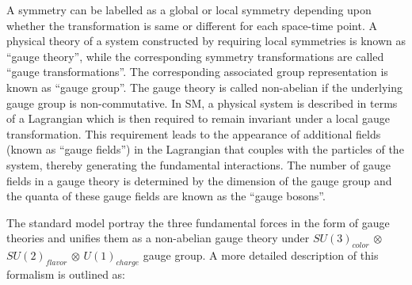 A symmetry can be labelled as a global or local symmetry depending upon whether the transformation is same or different for each space-time point.
A physical theory of a system constructed by requiring local symmetries is known as ``gauge theory'', while the corresponding symmetry transformations
are called ``gauge transformations''.
The corresponding associated group representation is known as ``gauge group''. The gauge theory is called non-abelian if
the underlying gauge group is non-commutative. In SM, a physical system is described in terms of a Lagrangian which is then required to remain invariant
under a local gauge transformation. This requirement leads to the appearance of additional fields (known as ``gauge fields'') in the Lagrangian that
couples with the particles of the system, thereby generating the fundamental interactions. The number of gauge fields
in a gauge theory is determined by the dimension of the gauge group and the quanta of these gauge fields are known as the ``gauge bosons''.

The standard model portray the three fundamental forces in the form of gauge theories and unifies them as a non-abelian gauge theory under
$SU (3)_{color}$ $\otimes$ $SU (2)_{flavor}$ $\otimes$ $U (1)_{charge}$ gauge group. A more detailed description of this formalism is outlined as:

